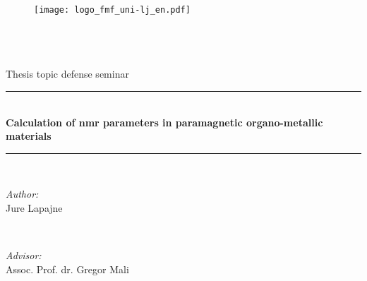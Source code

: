 \begin{titlepage}

\begin{figure}[t]
    \centering
    \texttt{[image: logo\_fmf\_uni-lj\_en.pdf]}
\end{figure}    

\newcommand{\HRule}{\rule{\linewidth}{0.5mm}} %

\center %
 

\textsc{\LARGE }\\[0cm] %
\textsc{\Large }\\[0cm] %
\textsc{\large }\\[0cm] Thesis topic defense seminar    %


\HRule \\[0.4cm]
{ \huge \bfseries Calculation of nmr parameters in paramagnetic organo-metallic materials}\\[0.4cm] %
\HRule \\[1.5cm]
 

\begin{minipage}{0.4\textwidth}
  \begin{flushleft} \large
   \raggedright
\emph{Author:}\\
Jure Lapajne \textsc{} %
\end{flushleft}
\end{minipage}
~
\begin{minipage}{0.45\textwidth}
  \begin{flushright} \large
    \raggedright
\emph{Advisor:} \\
Assoc. Prof. dr. Gregor Mali \textsc{} %
\end{flushright}
\end{minipage}\\[4cm]


\end{titlepage}
